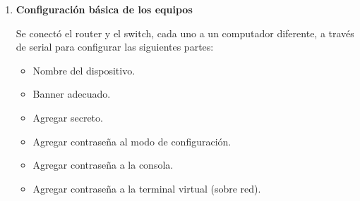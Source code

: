 \begin{enumerate}[series=labsteps]
  Para cables UTP existen 2 estándares,  y  como se muestra en la figura \ref{fig:utp}.

    \begin{figure}[h!]
      \center
      
      \caption{Diagrama que muestra la conexión de un cable UTP cruzado vs directo.}
      \label{fig:utp}
    \end{figure}

    Estos estándares dictan dónde se posicionan los pines de transmitir y recibir ( y ).
    Cuando se habla de un cable UTP directo, se refiere a un cable en el que ambos lados son del mismo estándar, 
    mientras que un cable cruzado tiene estándares diferentes.

    Esto significa que un cable UTP directo, sin importar si es  o , no cambia la 
    organización de los cables.
    Por el contrario, un cable UTP cruzado va a cambiar la organización de los cables.

    Se hace así porque los puertos de los dispositivos de red (como routers o switches) tienen una 
    organización diferente a los puertos de los dispositivos finales (como computadores).
    De modo que una conexión entre un switch y un computador requiere solo un cable directo porque los puertos 
    están físicamente organizados para que  vaya a  y viceversa.
    Pero en las ocasiones en que se requiere conectar 2 dispositivos de red, lo que causa que los puertos se vayan 
    en la dirección incorrecta, por esto se requiere un cable UTP cruzado.

    Aunque dispositivos \textit{modernos} pueden detectar la configuración incorrecta y corregirla internamente, 
    como es el caso del switch , de acuerdo con el fabricante \cite{cisco_2960_auto_mdix}.
    Por tanto, es irrelevante que el switch utilizado use un cable cruzado en este laboratorio.

\item \textbf{Configuración básica de los equipos}

  Se conectó el router y el switch, cada uno a un computador diferente, a través de serial para configurar 
  las siguientes partes:
  \begin{itemize}
    \item Nombre del dispositivo.
    \item Banner adecuado.
    \item Agregar secreto.
    \item Agregar contraseña al modo de configuración.
    \item Agregar contraseña a la consola.
    \item Agregar contraseña a la terminal virtual (sobre red).
  \end{itemize}


\end{enumerate}
